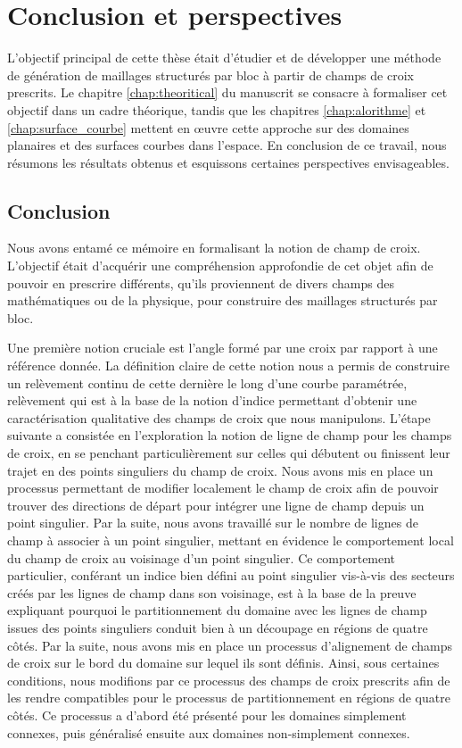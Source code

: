 \chapter{Conclusion et perspectives}
\label{chap:conclusion}

L'objectif principal de cette thèse était d'étudier et de développer une méthode de génération de maillages structurés par bloc à partir de champs de croix prescrits. Le chapitre \ref{chap:theoritical} du manuscrit se consacre à formaliser cet objectif dans un cadre théorique, tandis que les chapitres \ref{chap:alorithme} et \ref{chap:surface_courbe} mettent en œuvre cette approche sur des domaines planaires et des surfaces courbes dans l'espace. En conclusion de ce travail, nous résumons les résultats obtenus et esquissons certaines perspectives envisageables.

\section{Conclusion}

Nous avons entamé ce mémoire en formalisant la notion de champ de croix. L'objectif était d'acquérir une compréhension approfondie de cet objet afin de pouvoir en prescrire différents, qu'ils proviennent de divers champs des mathématiques ou de la physique, pour construire des maillages structurés par bloc.

Une première notion cruciale est l'angle formé par une croix par rapport à une référence donnée. La définition claire de cette notion nous a permis de construire un relèvement continu de cette dernière le long d'une courbe paramétrée, relèvement qui est à la base de la notion d'indice permettant d'obtenir une caractérisation qualitative des champs de croix que nous manipulons. L'étape suivante a consistée en l'exploration la notion de ligne de champ pour les champs de croix, en se penchant particulièrement sur celles qui débutent ou finissent leur trajet en des points singuliers du champ de croix. Nous avons mis en place un processus permettant de modifier localement le champ de croix afin de pouvoir trouver des directions de départ pour intégrer une ligne de champ depuis un point singulier. Par la suite, nous avons travaillé sur le nombre de lignes de champ à associer à un point singulier, mettant en évidence le comportement local du champ de croix au voisinage d'un point singulier. Ce comportement particulier, conférant un indice bien défini au point singulier vis-à-vis des secteurs créés par les lignes de champ dans son voisinage, est à la base de la preuve expliquant pourquoi le partitionnement du domaine avec les lignes de champ issues des points singuliers conduit bien à un découpage en régions de quatre côtés. Par la suite, nous avons mis en place un processus d'alignement de champs de croix sur le bord du domaine sur lequel ils sont définis. Ainsi, sous certaines conditions, nous modifions par ce processus des champs de croix prescrits afin de les rendre compatibles pour le processus de partitionnement en régions de quatre côtés. Ce processus a d'abord été présenté pour les domaines simplement connexes, puis généralisé ensuite aux domaines non-simplement connexes.

